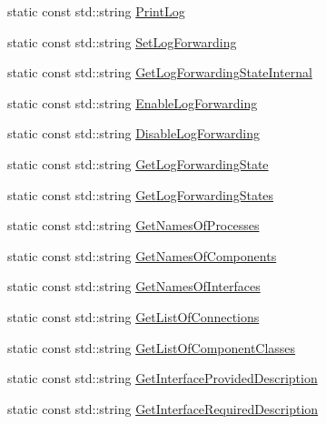 \begin{DoxyCompactItemize}
static const std\+::string \hyperlink{classmts_manager_component_base_1_1_command_names_a3a2d2301895563f7d943ff1014f8a4d6}{Print\+Log}
\item 
static const std\+::string \hyperlink{classmts_manager_component_base_1_1_command_names_a494481ad11ce948eb96b3528361a9606}{Set\+Log\+Forwarding}
\item 
static const std\+::string \hyperlink{classmts_manager_component_base_1_1_command_names_a71c259401593f4160cff60c9be3f6bd0}{Get\+Log\+Forwarding\+State\+Internal}
\item 
static const std\+::string \hyperlink{classmts_manager_component_base_1_1_command_names_a41cb283e554b57fd31e8eece7166fdc7}{Enable\+Log\+Forwarding}
\item 
static const std\+::string \hyperlink{classmts_manager_component_base_1_1_command_names_a323f4110ced3e22a39fe0c67b7f21be8}{Disable\+Log\+Forwarding}
\item 
static const std\+::string \hyperlink{classmts_manager_component_base_1_1_command_names_a039f0c03c366dadc10675b70e81b3b66}{Get\+Log\+Forwarding\+State}
\item 
static const std\+::string \hyperlink{classmts_manager_component_base_1_1_command_names_aa906abe73c7cc36fdc31f979f3b24228}{Get\+Log\+Forwarding\+States}
\item 
static const std\+::string \hyperlink{classmts_manager_component_base_1_1_command_names_acc637a1a5ddd03cd1f316ff284bbeb70}{Get\+Names\+Of\+Processes}
\item 
static const std\+::string \hyperlink{classmts_manager_component_base_1_1_command_names_a30b814882339835ab99d1a1458dfe5e7}{Get\+Names\+Of\+Components}
\item 
static const std\+::string \hyperlink{classmts_manager_component_base_1_1_command_names_a901635542033ad1816bf2e9ba20fcc38}{Get\+Names\+Of\+Interfaces}
\item 
static const std\+::string \hyperlink{classmts_manager_component_base_1_1_command_names_a81c8a5b498922e4f2d27faaa063e0994}{Get\+List\+Of\+Connections}
\item 
static const std\+::string \hyperlink{classmts_manager_component_base_1_1_command_names_a97dfc9528f6d693ec20ce8acab00e4ae}{Get\+List\+Of\+Component\+Classes}
\item 
static const std\+::string \hyperlink{classmts_manager_component_base_1_1_command_names_a48b6d419a169927b6adcbce8471bdb2b}{Get\+Interface\+Provided\+Description}
\item 
static const std\+::string \hyperlink{classmts_manager_component_base_1_1_command_names_a45417e53e8ddd8823a8ce9248c782d64}{Get\+Interface\+Required\+Description}

\end{DoxyCompactItemize}
